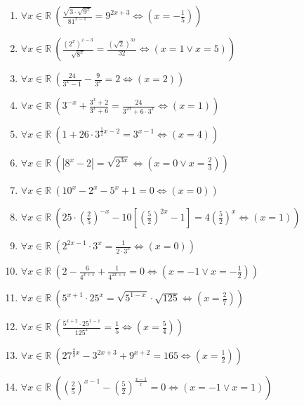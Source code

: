 \documentclass[11pt,a4paper]{article}
\begin{document}
\begin{enumerate}
\item $\displaystyle \forall x \in \mathbb{R}\ \left( \frac{\sqrt{3 \cdot \sqrt{9^{x}}}}{81^{x-1}} = 9^{2x+3} \iff \left( x = -\frac{1}{5} \right) \right)$
\item $\displaystyle \forall x \in \mathbb{R}\ \left( \frac{(2^{x})^{x-3}}{\sqrt{8^{x}}} = \frac{(\sqrt{2})^{3x}}{32} \iff \left( x = 1 \lor x = 5 \right) \right)$
\item $\displaystyle \forall x \in \mathbb{R}\ \left( \frac{24}{3^{x} - 1} - \frac{9}{3^{x}} = 2 \iff \left( x = 2 \right) \right)$
\item $\displaystyle \forall x \in \mathbb{R}\ \left( 3^{-x} + \frac{3^{x} + 2}{3^{x} + 6} = \frac{24}{3^{2x} + 6 \cdot 3^{x}} \iff \left( x = 1 \right) \right)$
\item $\displaystyle \forall x \in \mathbb{R}\ \left( 1 + 26 \cdot 3^{\frac{1}{2}x - 2} = 3^{x-1} \iff \left( x = 4 \right) \right)$
\item $\displaystyle \forall x \in \mathbb{R}\ \left( \left| 8^{x} - 2 \right| = \sqrt{2^{3x}} \iff \left( x = 0 \lor x = \frac{2}{3} \right) \right)$
\item $\displaystyle \forall x \in \mathbb{R}\ \left( 10^{x} - 2^{x} - 5^{x} + 1 = 0 \iff \left( x = 0 \right) \right)$
\item $\displaystyle \forall x \in \mathbb{R}\ \left( 25 \cdot \left(\frac{2}{5}\right)^{-x} - 10\left[\left(\frac{5}{2}\right)^{2x} - 1\right] = 4\left(\frac{5}{2}\right)^{x} \iff \left( x = 1 \right) \right)$
\item $\displaystyle \forall x \in \mathbb{R}\ \left( 2^{2x-1} \cdot 3^{x} = \frac{1}{2 \cdot 3^{x}} \iff \left( x = 0 \right) \right)$
\item $\displaystyle \forall x \in \mathbb{R}\ \left( 2 - \frac{6}{4^{x+1}} + \frac{1}{4^{2x+1}} = 0 \iff \left( x = -1 \lor x = -\frac{1}{2} \right) \right)$
\item $\displaystyle \forall x \in \mathbb{R}\ \left( 5^{x+1} \cdot 25^{x} = \sqrt{5^{1-x}} \cdot \sqrt{125} \iff \left( x = \frac{2}{7} \right) \right)$
\item $\displaystyle \forall x \in \mathbb{R}\ \left( \frac{5^{x+2} \cdot 25^{1-x}}{125^{x}} = \frac{1}{5} \iff \left( x = \frac{5}{4} \right) \right)$
\item $\displaystyle \forall x \in \mathbb{R}\ \left( 27^{\frac{2}{3}x} - 3^{2x+3} + 9^{x+2} = 165 \iff \left( x = \frac{1}{2} \right) \right)$
\item $\displaystyle \forall x \in \mathbb{R}\ \left( \left(\frac{2}{5}\right)^{x-1} - \left(\frac{5}{2}\right)^{\frac{x-1}{x}} = 0 \iff \left( x = -1 \lor x = 1 \right) \right)$

\end{enumerate}
\end{document}

